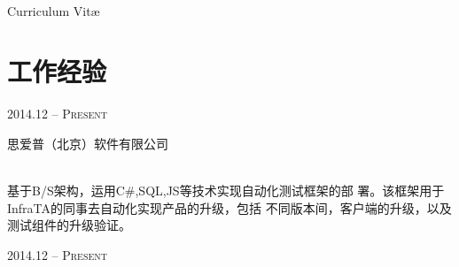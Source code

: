\documentclass[10pt]{article} %
\begin{document}
\color{text1} %


\par{\\ %
{\color{headings} Curriculum {Vit\ae}\\[15pt]\par} %
	

\begin{minipage}[t]{0.5\textwidth} %
\vspace{0pt} %
	

\section{工作经验} 

{\raggedleft\textsc{2014.12 -- Present}\par}

{\raggedright\large 思爱普（北京）软件有限公司\\[8pt] 

\\[8pt]}

\normalsize{
基于B\//S架构，运用C\#,SQL,JS等技术实现自动化测试框架的部
署。该框架用于InfraTA的同事去自动化实现产品的升级，包括
不同版本间，客户端的升级，以及测试组件的升级验证。
}\\



{\raggedleft\textsc{2014.12 -- Present}\par}


\end{minipage}}
\end{document}
